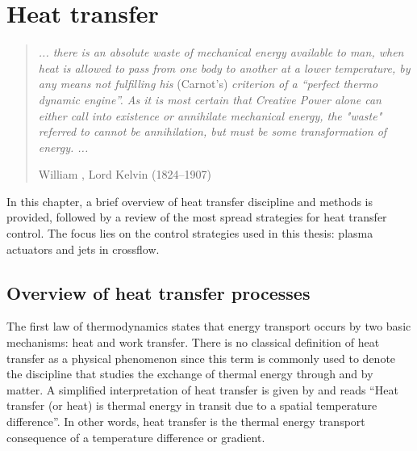 \chapter{Heat transfer}\label{ch02}
%
\begin{quote}
\textit{... there is an absolute waste of mechanical energy available to man, when heat is allowed to pass from one body to another at a lower temperature, by any means not fulfilling his} (Carnot's) \textit{criterion of a ``perfect thermo dynamic engine''. As it is most certain that Creative Power alone can either call into existence or annihilate mechanical energy, the "waste" referred to cannot be annihilation, but must be some transformation of energy. ...}

\begin{flushright}
William \citet{Thomson1852energy}, Lord Kelvin (1824–1907) \\
\end{flushright}

\end{quote}
\vspace{1cm}

In this chapter, a brief overview of heat transfer discipline and methods is provided, followed by a review of the most spread strategies for heat transfer control. The focus lies on the control strategies used in this thesis: plasma actuators and jets in crossflow.

\section{Overview of heat transfer processes}
The first law of thermodynamics states that energy transport occurs by two basic mechanisms: heat and work transfer. There is no classical definition of heat transfer as a physical phenomenon since this term is commonly used to denote the discipline that studies the exchange of thermal energy through and by matter. A simplified interpretation of heat transfer is given by \citet{bergman2011fundamentals} and reads ``Heat transfer (or heat) is thermal energy in transit due to a spatial temperature difference''. In other words, heat transfer is the thermal energy transport consequence of a temperature difference or gradient.

